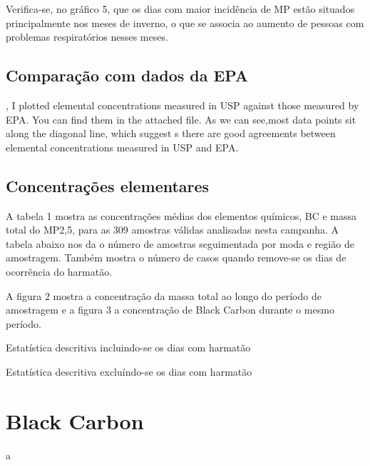 Verifica-se, no gráfico 5, que os dias com maior incidência de MP estão situados principalmente nos meses de inverno, o que se associa ao aumento de pessoas com problemas respiratórios nesses meses.



\subsection{Comparação com dados da EPA}
, I plotted elemental concentrations measured in USP against those measured by EPA. You can find them in the attached file. As we can see,most data points sit along the diagonal line, which suggest s there are good agreements between elemental concentrations measured in USP and EPA.

\subsection{Concentrações elementares}

A tabela 1 mostra as concentrações médias dos elementos químicos, 
BC e massa total do MP2,5, para as 309 amostras válidas analisadas nesta campanha.
A tabela abaixo nos da o número de amostras seguimentada por
moda e região de amostragem. 
Também mostra o número de casos quando remove-se os dias de ocorrência do harmatão.

A figura 2 mostra a concentração da massa total ao longo do período de amostragem e a figura 3 a concentração de Black Carbon durante o mesmo período.

\begin{table}[H]
 \centering
  
  \caption{Estatística descritiva incluindo-se os dias com harmatão}
\end{table}

\begin{table}[H]
  \centering
  
  \caption{Estatística descritiva excluíndo-se os dias com harmatão}
\end{table}

\section{Black Carbon}
a


